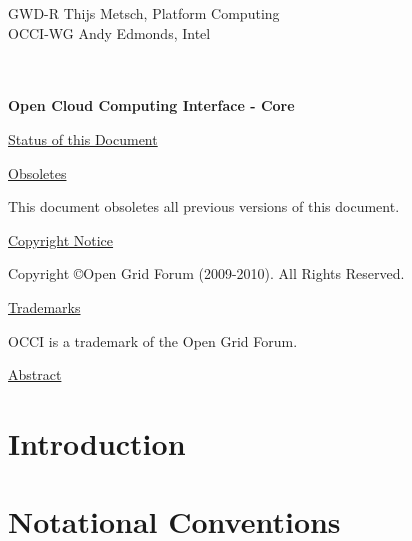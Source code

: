 \documentclass[10pt,a4paper]{article}
\begin{document}
\thispagestyle{empty}

GWD-R \hfill  Thijs Metsch, Platform Computing\\
OCCI-WG \hfill  Andy Edmonds, Intel\\
\\
\\

\vspace*{0.5in}

\begin{Large}
\textbf{Open Cloud Computing Interface - Core}
\end{Large}

\vspace*{0.5in}

\underline{Status of this Document}



\underline{Obsoletes}

This document obsoletes all previous versions of this document.

\underline{Copyright Notice}

Copyright \copyright Open Grid Forum (2009-2010). All Rights Reserved.

\underline{Trademarks}

OCCI is a trademark of the Open Grid Forum.

\underline{Abstract}



\newpage
\tableofcontents
\newpage

\section{Introduction}


\section{Notational Conventions}

\end{document}
